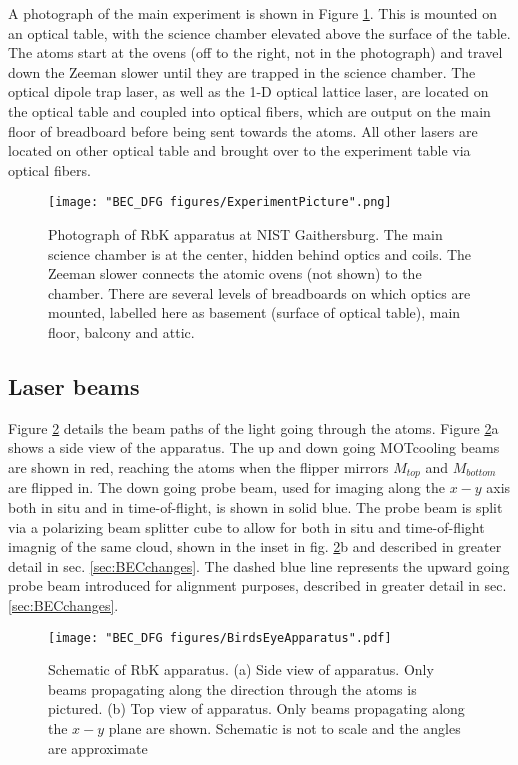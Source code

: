 A photograph of the main experiment is shown in Figure \ref{fig:ExperimentPicture}. This is mounted on an optical table, with the science chamber elevated above the surface of the table. The atoms start at the ovens (off to the right, not in the photograph) and travel down the Zeeman slower until they are trapped in the science chamber. The optical dipole trap laser, as well as the 1-D optical lattice laser, are located on the optical table and coupled into optical fibers, which are output on the main floor of breadboard before being sent towards the atoms. All other lasers are located on other optical table and brought over to the experiment table via optical fibers. 

\begin{figure}
	\texttt{[image: "BEC\_DFG figures/ExperimentPicture".png]}
\caption{Photograph of RbK apparatus at NIST Gaithersburg. The main science chamber is at the center, hidden behind optics and coils. The Zeeman slower connects the atomic ovens (not shown) to the chamber. There are several levels of breadboards on which optics are mounted, labelled here as basement (surface of optical table), main floor, balcony and attic.}
\label{fig:ExperimentPicture}
\end{figure}

\subsection{Laser beams}\label{sec:laserBeams}
Figure \ref{fig:BirdsEyeApparatus} details the beam paths of the light going through the atoms. Figure \ref{fig:BirdsEyeApparatus}a shows a side view of the apparatus. The up and down going MOTcooling beams are shown in red, reaching the atoms when the flipper mirrors $M_{top}$ and $M_{bottom}$ are flipped in. The down going probe beam, used for imaging along the $x-y$ axis both in situ and in time-of-flight, is shown in solid blue. The probe beam is split via a polarizing beam splitter cube to allow for both in situ and time-of-flight imagnig of the same cloud, shown in the inset in fig.  \ref{fig:BirdsEyeApparatus}b and described in greater detail in sec. \ref{sec:BECchanges}.  The dashed blue line represents the upward going probe beam introduced for alignment purposes, described in greater detail in sec. \ref{sec:BECchanges}. 
\begin{figure}
	\texttt{[image: "BEC\_DFG figures/BirdsEyeApparatus".pdf]}
\caption{Schematic of RbK apparatus. (a) Side view of apparatus. Only beams propagating along the \ez{} direction through the atoms is pictured. (b) Top view of apparatus. Only beams propagating along the $x-y$ plane are shown. Schematic is not to scale and the angles are approximate}
\label{fig:BirdsEyeApparatus}
\end{figure}

